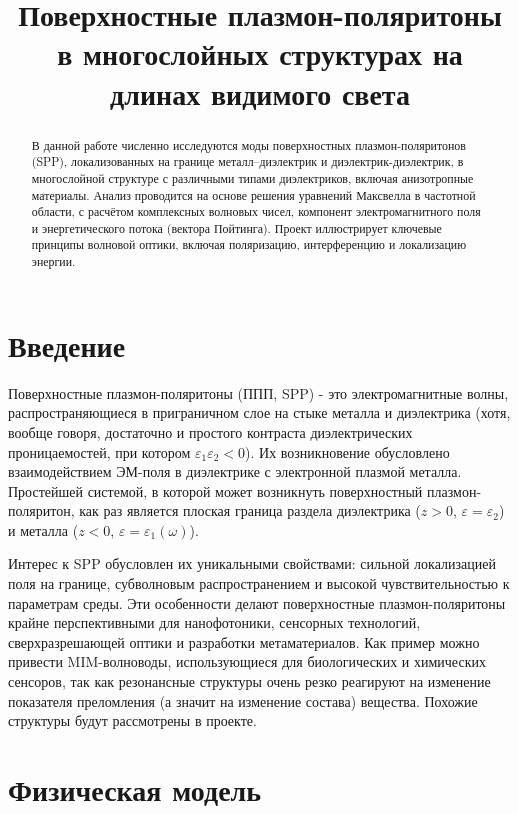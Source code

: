 \documentclass{article}
\title{Поверхностные плазмон-поляритоны в многослойных структурах на длинах видимого света}
\begin{document}
\maketitle

\begin{abstract}
В данной работе численно исследуются моды поверхностных плазмон-поляритонов (SPP), локализованных на границе металл–диэлектрик и диэлектрик-диэлектрик, в многослойной структуре с различными типами диэлектриков, включая анизотропные материалы. Анализ проводится на основе решения уравнений Максвелла в частотной области, с расчётом комплексных волновых чисел, компонент электромагнитного поля и энергетического потока (вектора Пойтинга). Проект иллюстрирует ключевые принципы волновой оптики, включая поляризацию, интерференцию и локализацию энергии.
\end{abstract}


\section{Введение}
Поверхностные плазмон-поляритоны (ППП, SPP) - это электромагнитные волны, распространяющиеся в приграничном слое на стыке металла и диэлектрика (хотя, вообще говоря, достаточно и простого контраста диэлектрических проницаемостей, при котором $\varepsilon_1 \varepsilon_2<0$). Их возникновение обусловлено взаимодействием ЭМ-поля в диэлектрике с электронной плазмой металла. Простейшей системой, в которой может возникнуть поверхностный плазмон-поляритон, как раз является плоская граница раздела диэлектрика ($z > 0$, $\varepsilon= \varepsilon_2$) и металла ($z < 0$, $\varepsilon= \varepsilon_1(\omega)$).

Интерес к SPP обусловлен их уникальными свойствами: сильной локализацией поля на границе, субволновым распространением и высокой чувствительностью к параметрам среды. Эти особенности делают поверхностные плазмон-поляритоны крайне перспективными для нанофотоники, сенсорных технологий, сверхразрешающей оптики и разработки метаматериалов. Как пример можно привести MIM-волноводы, использующиеся для биологических и химических сенсоров, так как резонансные структуры очень резко реагируют на изменение показателя преломления (а значит на изменение состава) вещества. Похожие структуры будут рассмотрены в проекте.

\clearpage

\section{Физическая модель}
\end{document}
